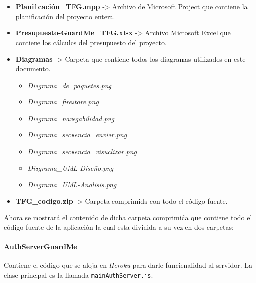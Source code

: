 \documentclass[11pt]{report}
\begin{document}
\begin{itemize}
	\item \textbf{Planificación\_TFG.mpp} -> Archivo de Microsoft Project que contiene la planificación del proyecto entera.
	\item \textbf{Presupuesto-GuardMe\_TFG.xlsx} -> Archivo Microsoft Excel que contiene los cálculos del presupuesto del proyecto.
	\item \textbf{Diagramas} -> Carpeta que contiene todos los diagramas utilizados en este documento.
	\begin{itemize}
		\item \textit{Diagrama\_de\_paquetes.png}
		\item \textit{Diagrama\_firestore.png}
		\item \textit{Diagrama\_navegabilidad.png}
		\item \textit{Diagrama\_secuencia\_enviar.png}
		\item \textit{Diagrama\_secuencia\_visualizar.png}
		\item \textit{Diagrama\_UML-Diseño.png}
		\item \textit{Diagrama\_UML-Analisis.png}
	\end{itemize}
	\item \textbf{TFG\_codigo.zip} -> Carpeta comprimida con todo el código fuente.
\end{itemize}

Ahora se mostrará el contenido de dicha carpeta comprimida que contiene todo el código fuente de la aplicación la cual esta dividida a su vez en dos carpetas:

\paragraph*{AuthServerGuardMe}
Contiene el código que se aloja en \textit{Heroku} para darle funcionalidad al servidor. La clase principal es la llamada \texttt{mainAuthServer.js}.
\end{document}
